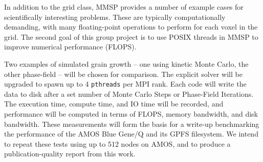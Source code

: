 \documentclass[11pt]{article}
\begin{document}
\begin{multicols}{2}
In addition to the grid class, MMSP provides a number of example cases for scientifically interesting problems.
These are typically computationally demanding, with many floating-point operations to perform for each voxel in the grid.
The second goal of this group project is to use POSIX threads in MMSP to improve numerical performance (FLOPS).

Two examples of simulated grain growth -- one using kinetic Monte Carlo, the other phase-field -- will be chosen for comparison.
The explicit solver will be upgraded to spawn up to 4 \texttt{pthreads} per MPI rank.
Each code will write the data to disk after a set number of Monte Carlo Steps or Phase-Field Iterations.
The execution time, compute time, and IO time will be recorded, and performance will be computed in terms of FLOPS, memory bandwidth, and disk bandwidth.
These measurements will form the basis for a write-up benchmarking the performance of the AMOS Blue Gene/Q and its GPFS filesystem.
We intend to repeat these tests using up to 512 nodes on AMOS, and to produce a publication-quality report from this work.
\end{multicols}
\label{LastPage}
\end{document}

